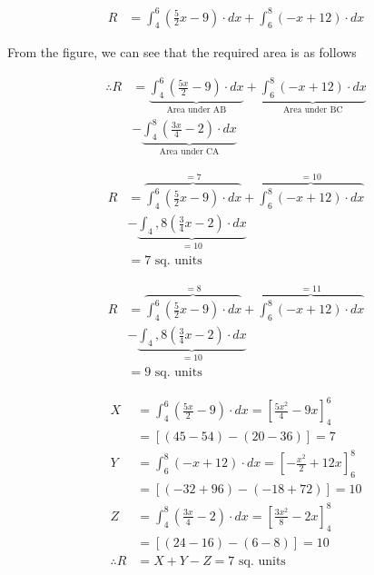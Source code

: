 \documentclass[14pt,fleqn]{extarticle}
\newcommand\ab{ \left(\frac{5}{2}x - 9 \right)}
\newcommand\bc{ \left(-x+12 \right)}
\newcommand\ca{ \left(\frac{3}{4}x - 2 \right)}
\begin{document}
\begin{align}
	R &= \int_4^6 \ab\cdot dx + \int_6^8 \bc\cdot dx 
\end{align}


\newcard

From the figure, we can see that the 
required area is as follows 

%
\begin{align}
\therefore R &= \underbrace{\int_4^6\left( \frac{5x}{2}-9\right)\cdot dx}_{\text{Area under AB}} 
+ \underbrace{\int_6^8(-x+12)\cdot dx}_{\text{Area under BC}} \\
&- \underbrace{\int_4^8\left( \frac{3x}{4}-2\right)\cdot dx}_{\text{Area under CA}}
\end{align}

\newcard

\begin{align}
	R &= \overbrace{\int_4^6 \ab\cdot dx}^{= 7} + \overbrace{\int_6^8 \bc\cdot dx}^{=10} \\
	&- \underbrace{\int_4,8 \ca\cdot dx}_{=10} \\
	&= 7\text{ sq. units} 
\end{align}

\newcard 

\begin{align}
	R &= \overbrace{\int_4^6 \ab\cdot dx}^{= 8} + \overbrace{\int_6^8 \bc\cdot dx}^{=11} \\
	&- \underbrace{\int_4,8 \ca\cdot dx}_{=10} \\
	&= 9\text{ sq. units} 
\end{align}


\newcard 

\begin{align}
X &= \int_4^6\left(\frac{5x}{2}-9\right)\cdot dx  
=\left[ \frac{5x^2}{4}-9x \right]_4^6 \\
&= \left[ \left(45-54\right)-\left(20-36\right) \right] =  7 \\
Y &= \int_6^8(-x+12)\cdot dx = \left[-\frac{x^2}{2}+12x \right]_6^8 \\
&=  \left[ \left(-32+96\right)-\left(-18+72\right) \right] =10 \\
Z &= \int_4^8\left( \frac{3x}{4}-2\right)\cdot dx = \left[ \frac{3x^2}{8}-2x\right]_4^8 \\
&=  \left[ \left(24 -16\right)-\left(6-8\right) \right] = 10 \\
\therefore R &= X+Y-Z = 7\text{ sq. units}
\end{align}
\end{document}
